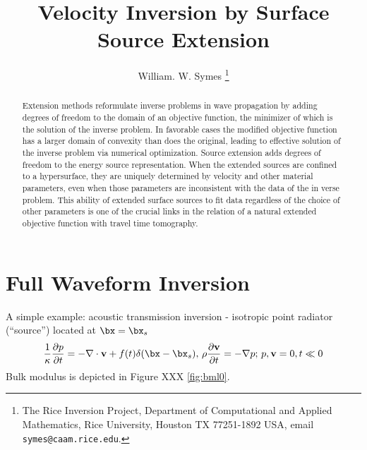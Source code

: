 \title{Velocity Inversion by Surface Source Extension}
\author{William. W. Symes \thanks{The Rice Inversion Project,
Department of Computational and Applied Mathematics, Rice University,
Houston TX 77251-1892 USA, email {\tt symes@caam.rice.edu}.}}



\maketitle
\begin{abstract}
Extension methods reformulate inverse problems in wave propagation by adding degrees of freedom to the domain of an objective function, the minimizer of which is the solution of the inverse problem. In favorable cases the modified objective function has a larger domain of convexity than does the original, leading to effective solution of the inverse problem via numerical optimization. Source extension adds degrees of freedom to the energy source representation. When the extended sources are confined to a hypersurface, they are uniquely determined by velocity and other material parameters, even when those parameters are inconsistent with the data of the in verse problem. This ability of extended surface sources to fit data regardless of the choice of other parameters is one of the crucial links in the relation of a natural extended objective function with travel time tomography.


\end{abstract}


\section{Full Waveform Inversion}

A simple example: acoustic transmission inversion - isotropic point radiator (``source'') located at  $\bx=\bx_s$
\begin{equation}
\label{eqn:awept}
\frac{1}{\kappa}\frac{\partial p}{\partial t} = -\nabla \cdot {\bf v} + f(t)\delta(\bx-\bx_s), \,\rho \frac{\partial {\bf v}}{\partial t} = - \nabla p; \,p,{\bf v}=0, t \ll 0
\end{equation}
Bulk modulus is depicted in Figure XXX \ref{fig:bml0}.


